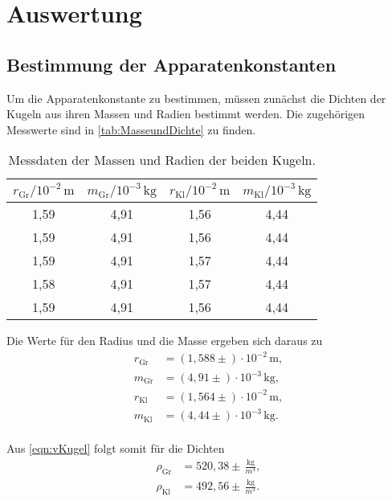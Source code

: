 \section{Auswertung}
\label{sec:Auswertung}

\subsection{Bestimmung der Apparatenkonstanten}
Um die Apparatenkonstante zu bestimmen, müssen zunächst die Dichten der Kugeln aus ihren Massen und Radien bestimmt werden. Die zugehörigen Messwerte sind in \autoref{tab:MasseundDichte} zu finden.

\begin{table}[H]
  \centering
  \caption{Messdaten der Massen und Radien der beiden Kugeln.}
  \label{tab:MasseundDichte}
  \begin{tabular}{c c c c}
    \toprule
    $r_{\text{Gr}}/10^{-2}\,\si{\meter}$ & $m_{\text{Gr}}/10^{-3}\,\si{\kilogram}$ & $r_{\text{Kl}}/10^{-2}\,\si{\meter}$ & $m_{\text{Kl}}/10^{-3}\,\si{\kilogram}$ \\
    \midrule
    1,59 & 4,91 & 1,56 & 4,44 \\
    1,59 & 4,91 & 1,56 & 4,44 \\
    1,59 & 4,91 & 1,57 & 4,44 \\
    1,58 & 4,91 & 1,57 & 4,44 \\
    1,59 & 4,91 & 1,56 & 4,44 \\
    \bottomrule
  \end{tabular}
\end{table}

Die Werte für den Radius und die Masse ergeben sich daraus zu
\begin{align*}
  r_{\text{Gr}} &= (1,588\pm ) \cdot 10^{-2} \,\si{\meter}, \\
  m_{\text{Gr}} &= (4,91\pm ) \cdot 10^{-3} \,\si{\kilogram}, \\
  r_{\text{Kl}} &= (1,564\pm ) \cdot 10^{-2} \,\si{\meter}, \\
  m_{\text{Kl}} &= (4,44\pm ) \cdot 10^{-3} \,\si{\kilogram}. \\
\end{align*}

Aus \autoref{eqn:vKugel} folgt somit für die Dichten
\begin{align*}
  \rho_{\text{Gr}} &= 520,38\pm  \,\frac{\si{\kg}}{\si{m^3}}, \\
  \rho_{\text{Kl}} &= 492,56\pm  \,\frac{\si{\kg}}{\si{m^3}}. \\
\end{align*}

